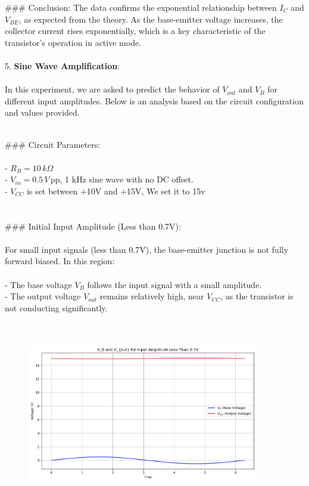 \documentclass{article}
\begin{document}
### Conclusion:
The data confirms the exponential relationship between \( I_C \) and \( V_{BE} \), as expected from the theory. As the base-emitter voltage increases, the collector current rises exponentially, which is a key characteristic of the transistor's operation in active mode.
\\ \\ 

5. \textbf{Sine Wave Amplification}:
\\ \\ 
In this experiment, we are asked to predict the behavior of \( V_{out} \) and \( V_B \) for different input amplitudes. Below is an analysis based on the circuit configuration and values provided.

\\
### Circuit Parameters:
\\ \\ 
- \( R_B = 10 \, k\Omega \) \\ 
- \( V_{in} = 0.5 \, V \, \text{pp} \), 1 kHz sine wave with no DC offset. \\ 
- \( V_{CC} \) is set between +10V and +15V, We set it to 15v \\ 
\\ \\ 
### Initial Input Amplitude (Less than 0.7V): \\ \\ 
For small input signals (less than 0.7V), the base-emitter junction is not fully forward biased. In this region:
\\ \\ 
- The base voltage \( V_B \) follows the input signal with a small amplitude. \\ 
- The output voltage \( V_{out} \) remains relatively high, near \( V_{CC} \), as the transistor is not conducting significantly.\\ 
\\ \\

\begin{figure}[H]
    \centering
    \includegraphics[width=0.9\textwidth]{./img/Lab5_5_Below.png}
    \caption{}
    \label{fig:graph1} 
\end{figure}
\\ \\ 
\end{document}
